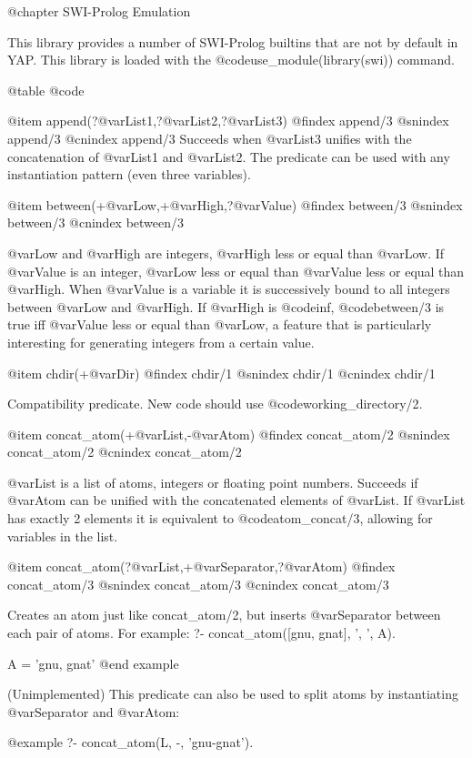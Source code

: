 @chapter SWI-Prolog Emulation

This library provides a number of SWI-Prolog builtins that are not by
default in YAP. This library is loaded with the
@code{use_module(library(swi))} command.

@table @code

@item append(?@var{List1},?@var{List2},?@var{List3})
@findex append/3
@snindex append/3
@cnindex append/3
Succeeds when @var{List3} unifies with the concatenation of @var{List1}
and @var{List2}. The predicate can be used with any instantiation
pattern (even three variables).

@item between(+@var{Low},+@var{High},?@var{Value})
@findex between/3
@snindex between/3
@cnindex between/3

@var{Low} and @var{High} are integers, @var{High} less or equal than
@var{Low}. If @var{Value} is an integer, @var{Low} less or equal than
@var{Value} less or equal than @var{High}.  When @var{Value} is a
variable it is successively bound to all integers between @var{Low} and
@var{High}.  If @var{High} is @code{inf}, @code{between/3} is true iff
@var{Value} less or equal than @var{Low}, a feature that is particularly
interesting for generating integers from a certain value.

@item chdir(+@var{Dir})
@findex chdir/1
@snindex chdir/1
@cnindex chdir/1

Compatibility predicate.  New code should use @code{working_directory/2}.

@item concat_atom(+@var{List},-@var{Atom})
@findex concat_atom/2
@snindex concat_atom/2
@cnindex concat_atom/2

@var{List} is a list of atoms, integers or floating point numbers. Succeeds
if @var{Atom} can be unified with the concatenated elements of @var{List}. If
@var{List} has exactly 2 elements it is equivalent to @code{atom_concat/3},
allowing for variables in the list.

@item concat_atom(?@var{List},+@var{Separator},?@var{Atom})
@findex concat_atom/3
@snindex concat_atom/3
@cnindex concat_atom/3

Creates an atom just like concat_atom/2, but inserts @var{Separator}
between each pair of atoms.  For example:
\@example
?- concat_atom([gnu, gnat], ', ', A).

A = 'gnu, gnat'
@end example

(Unimplemented) This predicate can also be used to split atoms by
instantiating @var{Separator} and @var{Atom}:

@example
?- concat_atom(L, -, 'gnu-gnat').

